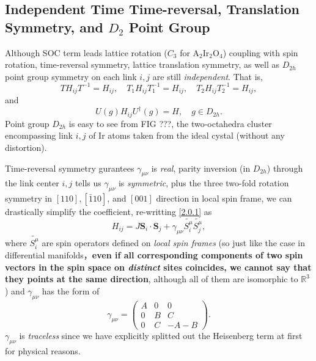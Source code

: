 \documentclass[10pt,nofootinbib]{revtex4}
\begin{document}
		\subsection{Independent Time Time-reversal, Translation Symmetry, and $D_2$ Point Group}
			Although SOC term leads lattice rotation ($C_3$ for $\mathrm{A_2Ir_2O_4}$) coupling with spin rotation, time-reversal symmetry, lattice translation symmetry, as well as $D_{2h}$ point group symmetry on each link $i,j$ are still \emph{independent}. That is,
			\begin{equation}\label{2.1.1}
				TH_{ij}T^{-1}=H_{ij},\quad T_{1}H_{ij}T_{1}^{-1}=H_{ij},\quad T_{2}H_{ij}T_{2}^{-1}=H_{ij},
			\end{equation}
			and
			\begin{equation}\label{2.1.2}
				U(g) H_{ij}U^\dagger(g)=H,\quad g\in D_{2h}.
			\end{equation}
			Point group $D_{2h}$ is easy to see from {\color{red}FIG ???}, the two-octahedra cluster encompassing link $i,j$ of Ir atoms taken from the ideal cystal (without any distortion).\par
			Time-reversal symmetry gurantees $\gamma_{\mu\nu}$ is \emph{real}, parity inversion (in $D_{2h}$) through the link center $i,j$ tells us $\gamma_{\mu\nu}$ is \emph{symmetric}, plus the three two-fold rotation symmetry in $[110],[\bar{1}10]$, and $[001]$ direction in local spin frame, we can drastically simplify the coefficient, re-writting \eqref{2.0.1} as
			\begin{equation}\label{2.1.3}
				H_{ij}=J\bm{S}_i\cdot\bm{S}_j+\gamma_{\mu\nu} \widetilde{S_i^\mu}\widetilde{S_j^\mu},
			\end{equation}
			where $\widetilde{S_i^\mu}$ are spin operators defined on \emph{\color{red}local spin frames} (so just like the case in differential manifolds，\textbf{even if all corresponding components of two spin vectors in the spin space on \emph{distinct} sites coincides, we cannot say that they points at the same direction}, although all of them are isomorphic to $\mathbb{R}^3$) and $\gamma_{\mu\nu}$ has the form of
			\begin{equation}\label{2.1.3}
				\gamma_{\mu\nu}=\left(\begin{array}{ccc}
					A & 0 & 0 \\ 0 & B & C \\ 0 & C & -A-B
				\end{array}\right).
			\end{equation}
			$\gamma_{\mu\nu}$ is \emph{traceless} since we have explicitly splitted out the Heisenberg term at first for physical reasons.
\end{document}
